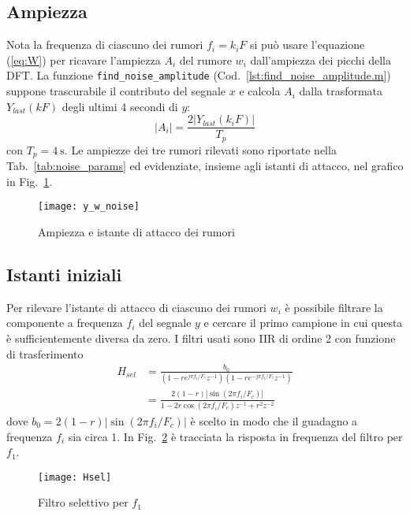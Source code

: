\documentclass{article}
\newcommand{\fig}[1]{Fig.~\ref{#1}}
\newcommand{\cod}[1]{Cod.~\ref{#1}}
\newcommand{\tab}[1]{Tab.~\ref{#1}}
\newcommand{\eqn}[1]{(\ref{#1})}
\newcommand{\inlcd}[1]{\lstinline[basicstyle=\ttfamily,keywordstyle={}]{#1}}
\begin{document}
\subsection{Ampiezza}
Nota la frequenza di ciascuno dei rumori $f_i = k_iF$ si può usare
l'equazione \eqn{eq:W} per ricavare l'ampiezza $A_i$ del rumore $w_i$
dall'ampiezza dei picchi della DFT.  La funzione
\inlcd{find_noise_amplitude} (\cod{lst:find_noise_amplitude.m})
suppone trascurabile il contributo del segnale $x$ e calcola $A_i$
dalla trasformata $Y_\mathit{last}(kF)$ degli ultimi 4 secondi di $y$:
\begin{equation}
  |A_i| = \frac{2|Y_\mathit{last}(k_iF)|}{T_p}
\end{equation}
con $T_p = \SI{4}{\s}$. Le ampiezze dei tre rumori rilevati sono
riportate nella \tab{tab:noise_params} ed evidenziate, insieme agli
istanti di attacco, nel grafico in \fig{plot:y_w_noises}.

\begin{figure}[h]
  \centering
  \texttt{[image: y\_w\_noise]}
  \caption{Ampiezza e istante di attacco dei rumori}
  \label{plot:y_w_noises}
\end{figure}

\subsection{Istanti iniziali}
Per rilevare l'istante di attacco di ciascuno dei rumori $w_i$ è
possibile filtrare la componente a frequenza $f_i$ del segnale $y$ e
cercare il primo campione in cui questa è sufficientemente diversa da
zero. I filtri usati sono IIR di ordine 2 con funzione di
trasferimento
\begin{align}
  H_\mathit{sel} &= \frac{b_0}{
    (1 - re^{j\pi f_i/F_c}z^{-1})
    (1 - re^{-j\pi f_i/F_c}z^{-1})} \\
  &= \frac{2(1-r)|\sin(2\pi f_i/F_c)|}
  {1 - 2r\cos(2\pi f_i/F_c)z^{-1} + r^2z^{-2}}
\end{align}
dove $b_0 = 2(1-r)|\sin(2\pi f_i/F_c)|$ è scelto in modo che il
guadagno a frequenza $f_i$ sia circa 1. In \fig{plot:Hsel} è tracciata
la risposta in frequenza del filtro per $f_1$.

\begin{figure}[h]
  \centering
  \texttt{[image: Hsel]}
  \caption{Filtro selettivo per $f_1$}
  \label{plot:Hsel}
\end{figure}
\end{document}
